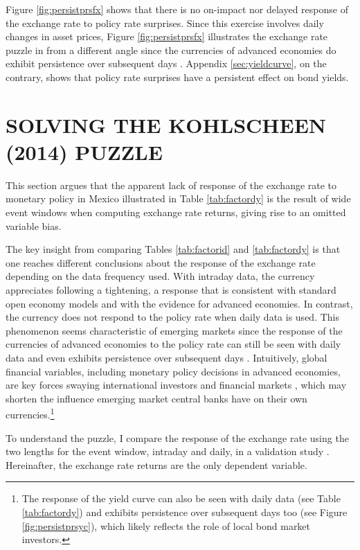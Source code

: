 \documentclass[a4paper,12pt]{article} 		%
\begin{document}
Figure \ref{fig:persistprsfx} shows that there is no on-impact nor delayed response of the exchange rate to policy rate surprises. Since this exercise involves daily changes in asset prices, Figure \ref{fig:persistprsfx} illustrates the exchange rate puzzle in \textcite{Kohlscheen:2014} from a different angle since the currencies of advanced economies do exhibit persistence over subsequent days \parencite{Rosa:2011JBF, FerrariKearnsSchrimpf:2021}. Appendix \ref{sec:yieldcurve}, on the contrary, shows that policy rate surprises have a persistent effect on bond yields. 

\sectitlespace
\section{SOLVING THE KOHLSCHEEN (2014) PUZZLE} \label{sec:puzzle}
\sectitlespace

This section argues that the apparent lack of response of the exchange rate to monetary policy in Mexico illustrated in Table \ref{tab:factordy} is the result of wide event windows when computing exchange rate returns, giving rise to an omitted variable bias. 

The key insight from comparing Tables \ref{tab:factorid} and \ref{tab:factordy} is that one reaches different conclusions about the response of the exchange rate depending on the data frequency used. With intraday data, the currency appreciates following a tightening, a response that is consistent with standard open economy models and with the evidence for advanced economies. In contrast, the currency does not respond to the policy rate when daily data is used. This phenomenon seems characteristic of emerging markets \parencite{Kohlscheen:2014} since the response of the currencies of advanced economies to the policy rate can still be seen with daily data and even exhibits persistence over subsequent days \parencite{Rosa:2011JBF,Wright:2012, FerrariKearnsSchrimpf:2021}. Intuitively, global financial variables, including monetary policy decisions in advanced economies, are key forces swaying international investors and financial markets \parencite{Rey:2013}, which may shorten the influence emerging market central banks have on their own currencies.\footnote{The response of the yield curve can also be seen with daily data (see Table \ref{tab:factordy}) and exhibits persistence over subsequent days too (see Figure \ref{fig:persistprsyc}), which likely reflects the role of local bond market investors.} 

To understand the puzzle, I compare the response of the exchange rate using the two lengths for the event window, intraday and daily, in a validation study \parencite{Boundetal:1994}. Hereinafter, the exchange rate returns are the only dependent variable.
\end{document}
